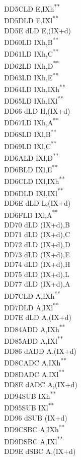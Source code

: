 \documentclass[twoside,openright,a4paper]{book}
\newcommand{\UNDOC}{\textnormal{\textsuperscript{**}}}
\begin{document}
\begin{multicols}{3}
{\begin{tabbing}
	DD5C\>LD E,IXh\UNDOC\\
	DD5D\>LD E,IXl\UNDOC\\
	DD5E d\>LD E,(IX+d)\\
	DD60\>LD IXh,B\UNDOC\\
	DD61\>LD IXh,C\UNDOC\\
	DD62\>LD IXh,D\UNDOC\\
	DD63\>LD IXh,E\UNDOC\\
	DD64\>LD IXh,IXh\UNDOC\\
	DD65\>LD IXh,IXl\UNDOC\\
	DD66 d\>LD H,(IX+d)\\
	DD67\>LD IXh,A\UNDOC\\
	DD68\>LD IXl,B\UNDOC\\
	DD69\>LD IXl,C\UNDOC\\
	DD6A\>LD IXl,D\UNDOC\\
	DD6B\>LD IXl,E\UNDOC\\
	DD6C\>LD IXl,IXh\UNDOC\\
	DD6D\>LD IXl,IXl\UNDOC\\
	DD6E d\>LD L,(IX+d)\\
	DD6F\>LD IXl,A\UNDOC\\
	DD70 d\>LD (IX+d),B\\
	DD71 d\>LD (IX+d),C\\
	DD72 d\>LD (IX+d),D\\
	DD73 d\>LD (IX+d),E\\
	DD74 d\>LD (IX+d),H\\
	DD75 d\>LD (IX+d),L\\
	DD77 d\>LD (IX+d),A\\
	DD7C\>LD A,IXh\UNDOC\\
	DD7D\>LD A,IXl\UNDOC\\
	DD7E d\>LD A,(IX+d)\\
	DD84\>ADD A,IXh\UNDOC\\
	DD85\>ADD A,IXl\UNDOC\\
	DD86 d\>ADD A,(IX+d)\\
	DD8C\>ADC A,IXh\UNDOC\\
	DD8D\>ADC A,IXl\UNDOC\\
	DD8E d\>ADC A,(IX+d)\\
	DD94\>SUB IXh\UNDOC\\
	DD95\>SUB IXl\UNDOC\\
	DD96 d\>SUB (IX+d)\\
	DD9C\>SBC A,IXh\UNDOC\\
	DD9D\>SBC A,IXl\UNDOC\\
	DD9E d\>SBC A,(IX+d)\\

\end{tabbing}}
\end{multicols}
\end{document}
